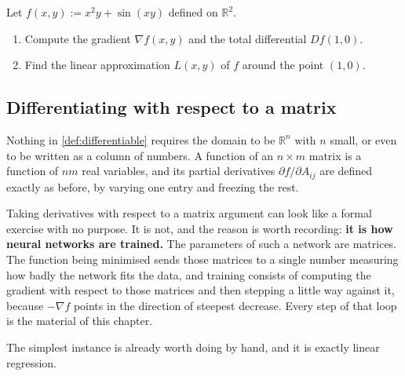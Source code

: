 
\begin{aiexercise}
\label{ex:ai_differential_linearization}
Let $f(x,y) := x^2 y + \sin(xy)$ defined on $\mathbb{R}^2$.
\begin{enumerate}[label=\textbf{(\alph*)}]
  \item Compute the gradient $\nabla f(x,y)$ and the total differential $Df(1,0)$.
  \item Find the linear approximation $L(x,y)$ of $f$ around the point $(1,0)$.
\end{enumerate}
\end{aiexercise}

\subsection{Differentiating with respect to a matrix}
\label{sec:differentiating_wrt_matrix}

Nothing in \cref{def:differentiable} requires the domain to be $\mathbb{R}^n$ with $n$ small, or
even to be written as a column of numbers. A function of an $n\times m$ matrix is a function of
$nm$ real variables, and its partial derivatives $\partial f/\partial A_{ij}$ are defined exactly
as before, by varying one entry and freezing the rest.

\begin{remark}
Taking derivatives with respect to a matrix argument can look like a formal exercise with no
purpose. It is not, and the reason is worth recording: \textbf{it is how neural networks are
trained.} The parameters of such a network are matrices. The function being minimised sends those
matrices to a single number measuring how badly the network fits the data, and training consists
of computing the gradient with respect to those matrices and then stepping a little way against
it, because $-\nabla f$ points in the direction of steepest decrease. Every step of that loop is
the material of this chapter.
\end{remark}

The simplest instance is already worth doing by hand, and it is exactly linear regression.

